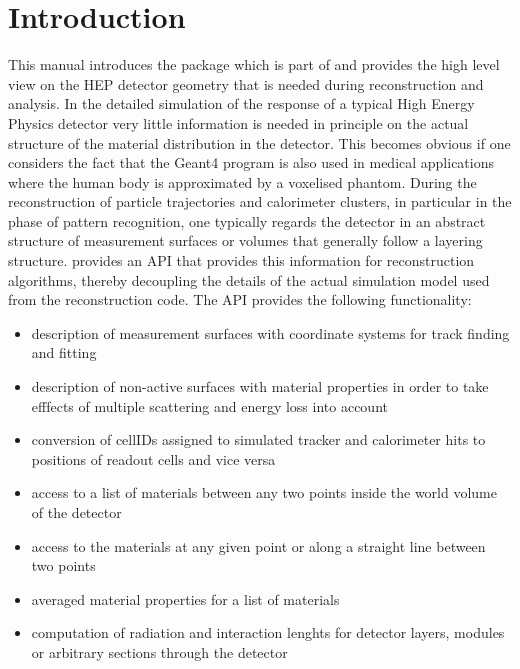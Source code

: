 \documentclass[10pt,a4paper]{article}
\begin{document}
\clearpage
%
%
\tableofcontents
\clearpage
%
%
\setcounter{page}{1}

\section{Introduction}
\label{sec:ddrec-manual-introduction}
\noindent
This manual introduces the \DDR package which is part of \DDH and provides the 
high level view on the HEP detector geometry that is needed during reconstruction and 
analysis. 
In the detailed simulation of the response of a typical High Energy Physics detector
very little information is needed in principle on the actual structure of the material
distribution in the detector. This becomes obvious if one considers the fact that
the Geant4 program is also used in medical applications where the human body 
is approximated by a voxelised phantom.
During the reconstruction of particle trajectories and calorimeter clusters, in particular 
in the phase of pattern recognition, one typically regards the detector in an abstract
structure of measurement surfaces or volumes that generally follow a layering structure.
\DDR provides an API that provides this information for reconstruction algorithms, thereby
decoupling the details of the actual simulation model used from the reconstruction code.
\noindent
The \DDR API provides the following functionality:

\begin{itemize}\itemcompact
\item description of measurement surfaces with coordinate systems for 
  track finding and fitting
\item description of non-active surfaces with material properties in
  order to take efffects of multiple scattering and energy loss
  into account
\item conversion of cellIDs assigned to simulated tracker and calorimeter hits
  to positions of readout cells and vice versa
\item access to a list of materials between any two points inside the world
  volume of the detector
\item access to the materials at any given point or along a straight line between two points
\item averaged material properties for a list of materials
\item computation of radiation and interaction lenghts for detector layers, modules
  or arbitrary sections through the detector
\end{itemize}
\end{document}
